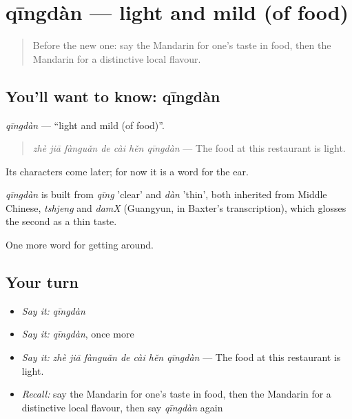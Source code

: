 \section[qīngdàn]{qīngdàn — light and mild (of food)}

\label{lesson:ZH-C449-qingdan}



\begin{quote}
Before the new one: say the Mandarin for one's taste in food, then the Mandarin for a distinctive local flavour.
\end{quote}

\subsection*{You'll want to know: qīngdàn}
\emph{qīngdàn} — \textquotedblleft{}light and mild (of food)\textquotedblright{}.

\begin{quote}
\emph{zhè jiā fànguǎn de cài hěn qīngdàn} — The food at this restaurant is light.
\end{quote}

Its characters come later; for now it is a word for the ear.

\begin{cousinweb}
\emph{qīngdàn} is built from \emph{qīng} 'clear' and \emph{dàn} 'thin', both inherited from Middle Chinese, \emph{tshjeng} and \emph{damX} (Guangyun, in Baxter's transcription), which glosses the second as a thin taste.
\end{cousinweb}

\begin{grammarlens}[title={What you've built}]
One more word for getting around.
\end{grammarlens}

\subsection*{Your turn}
\begin{itemize}
\raggedright
  \item \emph{Say it:} \emph{qīngdàn}
  \item \emph{Say it:} \emph{qīngdàn}, once more
  \item \emph{Say it:} \emph{zhè jiā fànguǎn de cài hěn qīngdàn} — The food at this restaurant is light.
  \item \emph{Recall:} say the Mandarin for one's taste in food, then the Mandarin for a distinctive local flavour, then say \emph{qīngdàn} again
\end{itemize}

